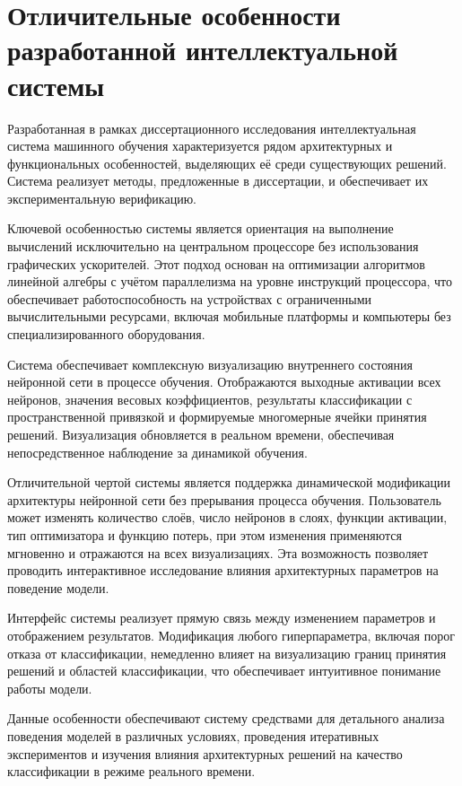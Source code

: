 \section{Отличительные особенности разработанной интеллектуальной системы}

Разработанная в рамках диссертационного исследования интеллектуальная система машинного обучения характеризуется рядом архитектурных и функциональных особенностей, выделяющих её среди существующих решений. Система реализует методы, предложенные в диссертации, и обеспечивает их экспериментальную верификацию.

Ключевой особенностью системы является ориентация на выполнение вычислений исключительно на центральном процессоре без использования графических ускорителей. Этот подход основан на оптимизации алгоритмов линейной алгебры с учётом параллелизма на уровне инструкций процессора, что обеспечивает работоспособность на устройствах с ограниченными вычислительными ресурсами, включая мобильные платформы и компьютеры без специализированного оборудования.

Система обеспечивает комплексную визуализацию внутреннего состояния нейронной сети в процессе обучения. Отображаются выходные активации всех нейронов, значения весовых коэффициентов, результаты классификации с пространственной привязкой и формируемые многомерные ячейки принятия решений. Визуализация обновляется в реальном времени, обеспечивая непосредственное наблюдение за динамикой обучения.

Отличительной чертой системы является поддержка динамической модификации архитектуры нейронной сети без прерывания процесса обучения. Пользователь может изменять количество слоёв, число нейронов в слоях, функции активации, тип оптимизатора и функцию потерь, при этом изменения применяются мгновенно и отражаются на всех визуализациях. Эта возможность позволяет проводить интерактивное исследование влияния архитектурных параметров на поведение модели.

Интерфейс системы реализует прямую связь между изменением параметров и отображением результатов. Модификация любого гиперпараметра, включая порог отказа от классификации, немедленно влияет на визуализацию границ принятия решений и областей классификации, что обеспечивает интуитивное понимание работы модели.

Данные особенности обеспечивают систему средствами для детального анализа поведения моделей в различных условиях, проведения итеративных экспериментов и изучения влияния архитектурных решений на качество классификации в режиме реального времени.